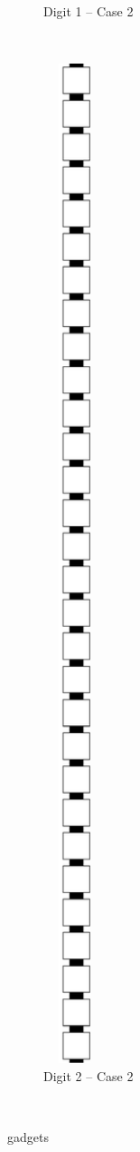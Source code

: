 \begin{itemize}
\begin{figure}[H]
\begin{subfigure}[t]{0.2\textwidth}
                \caption{\label{fig:warping/pre_warp_case2_digit1_msr} Digit 1 -- Case 2}
            \end{subfigure}%
            ~
            \begin{subfigure}[t]{0.2\textwidth}
                \centering
                \includegraphics[width=0.2\textwidth]{warping/pre_warp_case2_digit2_msr}
                \caption{\label{fig:warping/pre_warp_case2_digit2_msr} Digit 2 -- Case 2}
            \end{subfigure}%
            ~
            \caption{\label{fig:pre_warp_gadgets} {\prewarp} gadgets }
        \end{figure}



\end{itemize}
